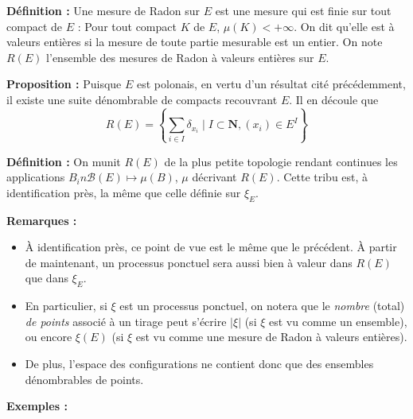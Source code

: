 \documentclass[12pt]{article}
\let\oldsum\sum
\renewcommand{\sum}{\oldsum\limits}
\begin{document}
\textbf{Définition :} Une mesure de Radon sur $E$ est une mesure qui est finie sur tout compact de $E$ : Pour tout compact $K$ de $E$, $ \mu(K) < +\infty $. On dit qu'elle est à valeurs entières si la mesure de toute partie mesurable est un entier. On note $ R(E) $ l'ensemble des mesures de Radon à valeurs entières sur $E$.

\textbf{Proposition :} Puisque $E$ est polonais, en vertu d'un résultat cité précédemment, il existe une suite dénombrable de compacts recouvrant $E$. Il en découle que $$ R(E) = \left\{ \sum_{i \in I} \delta_{x_i} \mid I \subset \mathbf N, (x_i) \in E^I \right\} $$ 

\textbf{Définition :} On munit $R(E)$ de la plus petite topologie rendant continues les applications $ B _in \mathcal B(E) \mapsto \mu(B) $, $\mu$ décrivant $R(E)$. Cette tribu est, à identification près, la même que celle définie sur $ \xi_E$.

\textbf{Remarques :} 

\begin{itemize}
  
  \item À identification près, ce point de vue est le même que le précédent. À partir de maintenant, un processus ponctuel sera aussi bien à valeur dans $R(E)$ que dans $\xi_E$. 

  \item En particulier, si $ \xi $ est un processus ponctuel, on notera que le \textit{nombre} (total) \textit{de points} associé à un tirage peut s'écrire $ | \xi | $ (si $\xi $ est vu comme un ensemble), ou encore $ \xi(E) $ (si $\xi$ est vu comme une mesure de Radon à valeurs entières).
  
  \item De plus, l'espace des configurations ne contient donc que des ensembles dénombrables de points.

\end{itemize}

\textbf{Exemples :} 
\end{document}
